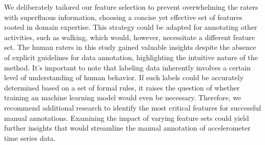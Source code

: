 \documentclass[
  10pt,
]{scrbook}
\begin{document}
We deliberately tailored our feature selection to prevent overwhelming
the raters with superfluous information, choosing a concise yet
effective set of features rooted in domain expertise. This strategy
could be adapted for annotating other activities, such as walking, which
would, however, necessitate a different feature set. The human raters in
this study gained valuable insights despite the absence of explicit
guidelines for data annotation, highlighting the intuitive nature of the
method. It's important to note that labeling data inherently involves a
certain level of understanding of human behavior. If such labels could
be accurately determined based on a set of formal rules, it raises the
question of whether training an machine learning model would even be
necessary. Therefore, we recommend additional research to identify the
most critical features for successful manual annotations. Examining the
impact of varying feature sets could yield further insights that would
streamline the manual annotation of accelerometer time series data.
\end{document}
